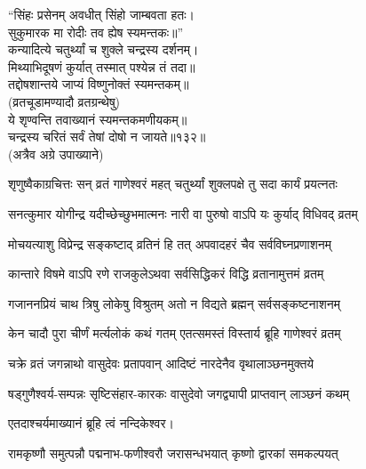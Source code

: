 
“सिंहः प्रसेनम् अवधीत् सिंहो जाम्बवता हतः।\\
सुकुमारक मा रोदीः तव ह्येष स्यमन्तकः॥”\\

कन्यादित्ये चतुर्थ्यां च शुक्ले चन्द्रस्य दर्शनम्।\\
मिथ्याभिदूषणं कुर्यात् तस्मात् पश्येन्न तं तदा॥\\
तद्दोषशान्तये जाप्यं विष्णुनोक्तं स्यमन्तकम्॥\\
(व्रतचूडामण्यादौ व्रतग्रन्थेषु)\\

ये शृण्वन्ति तवाख्यानं स्यमन्तकमणीयकम्॥ \\
चन्द्रस्य चरितं सर्वं तेषां दोषो न जायते॥१३२॥\\
(अत्रैव अग्रे उपाख्याने)\\


\twolineshloka
{शृणुष्वैकाग्रचित्तः सन् व्रतं गाणेश्वरं महत्}
{चतुर्थ्यां शुक्लपक्षे तु सदा कार्यं प्रयत्नतः}%

\twolineshloka
{सनत्कुमार योगीन्द्र यदीच्छेच्छुभमात्मनः}
{नारी वा पुरुषो वाऽपि यः कुर्याद् विधिवद् व्रतम्}%

\twolineshloka
{मोचयत्याशु विप्रेन्द्र सङ्कष्टाद् व्रतिनं हि तत्}
{अपवादहरं चैव सर्वविघ्नप्रणाशनम्}%

\twolineshloka
{कान्तारे विषमे वाऽपि रणे राजकुलेऽथवा}
{सर्वसिद्धिकरं विद्धि व्रतानामुत्तमं व्रतम्}%

\twolineshloka
{गजाननप्रियं चाथ त्रिषु लोकेषु विश्रुतम्}
{अतो न विद्यते ब्रह्मन् सर्वसङ्कष्टनाशनम्}%


\twolineshloka
{केन चादौ पुरा चीर्णं मर्त्यलोकं कथं गतम्}
{एतत्समस्तं विस्तार्य ब्रूहि गाणेश्वरं व्रतम्}%

\twolineshloka
{चक्रे व्रतं जगन्नाथो वासुदेवः प्रतापवान्}
{आदिष्टं नारदेनैव वृथालाञ्छनमुक्तये}%

\twolineshloka
{षड्गुणैश्वर्य-सम्पन्नः सृष्टिसंहार-कारकः} 
{वासुदेवो जगद्व्यापी प्राप्तवान् लाञ्छनं कथम्}%

एतदाश्चर्यमाख्यानं ब्रूहि त्वं नन्दिकेश्वर।


\twolineshloka
{रामकृष्णौ समुत्पन्नौ पद्मनाभ-फणीश्वरौ}
{जरासन्धभयात् कृष्णो द्वारकां समकल्पयत्}%

